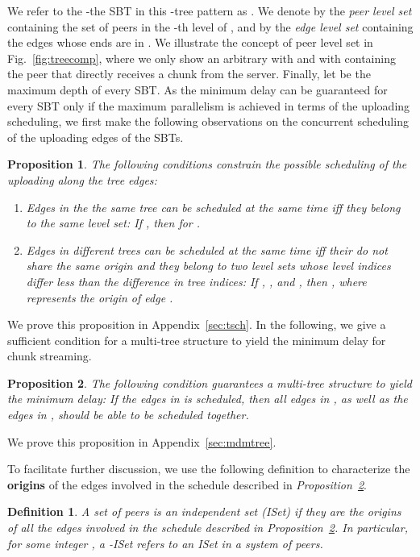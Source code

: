 \documentclass[conference]{IEEEtran}
\newtheorem{defi}{Definition}
\newtheorem{prop}{Proposition}
\begin{document}
  We refer to the -the SBT in this -tree pattern as \framebox{}. We denote by \framebox{} the \textit{peer level set} containing the set of peers in the -th level of , and by \framebox{} the \textit{edge level set} containing the edges whose ends are in  .  We illustrate the concept of peer level set in Fig.~\ref{fig:treecomp}, where we only show an arbitrary  with  and with  containing the peer that directly receives a chunk from the server. Finally, let  be the maximum depth of every SBT. As the minimum delay can be guaranteed for every SBT only if the maximum parallelism is achieved in terms of the uploading scheduling, we first make the following observations on the concurrent scheduling of the uploading edges of the SBTs.
\vspace{1ex}
  \begin{prop} \label{prop:feasible}
    The following conditions constrain the possible scheduling of the uploading along the tree edges:
\begin{enumerate}
\item Edges in the the same tree can be scheduled at the same time iff they belong to the same level set: If , then  for  .
\item Edges in different trees can be scheduled at the same time iff their do not share the same origin and they belong to two level sets whose level indices differ less than the difference in tree indices: If , , and , then , where  represents the origin of edge .
    \end{enumerate}
\end{prop}
We prove this proposition in Appendix~\ref{sec:tsch}. In the following, we give a sufficient condition for a multi-tree structure to yield the minimum delay for chunk streaming.
\vspace{1ex}
  \begin{prop} \label{prop:sufficient}
    The following condition guarantees a multi-tree structure to yield the minimum delay: If the edges in  is scheduled, then all edges in , as well as the  edges in , should be able to be scheduled together.
  \end{prop}
  \vspace{1ex}
We prove this proposition in Appendix~\ref{sec:mdmtree}.

  To facilitate further discussion, we use the following definition to characterize the \textbf{origins} of the edges involved in the schedule described in \textit{Proposition~\ref{prop:sufficient}}.
\vspace{1ex}
  \begin{defi}
  A set of peers is an \textit{independent set} (ISet) if they are the origins of all the edges involved in the schedule described in \textit{Proposition~\ref{prop:sufficient}}. In particular, for some integer , a -ISet refers to an ISet in a system of  peers.
  \end{defi}
  \vspace{1ex}
\end{document}
